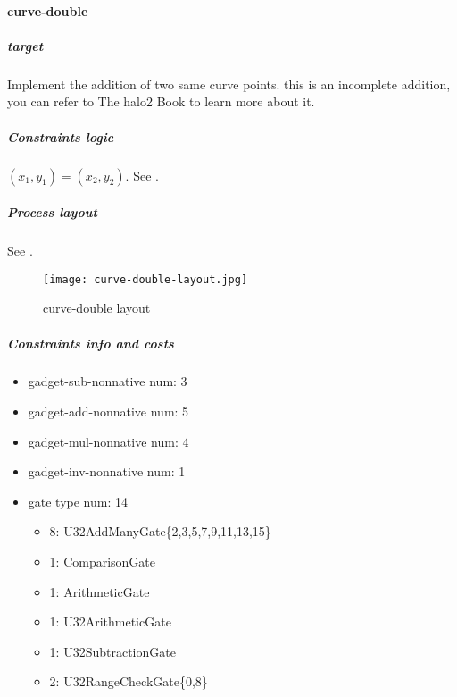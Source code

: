 \paragraph{curve-double}

\subparagraph{target}
Implement the addition of two same curve points. this is an incomplete addition, you can refer to The halo2 Book\cite{website:halo2-book} to learn more about it.

\subparagraph{Constraints logic}
$(x_1,y_1) = (x_2,y_2)$. See .

\subparagraph{Process layout}
See .
\begin{figure}[!ht]
    \centering
    \texttt{[image: curve-double-layout.jpg]}
    \caption{curve-double layout}
    \label{fig:curve-double-layout}
\end{figure}

\subparagraph{Constraints info and costs}
\begin{itemize}
    \item gadget-sub-nonnative num: 3
    \item gadget-add-nonnative num: 5
    \item gadget-mul-nonnative num: 4
    \item gadget-inv-nonnative num: 1
    \item gate type num: 14
        \begin{itemize}
            \item 8: U32AddManyGate\{2,3,5,7,9,11,13,15\}
            \item 1: ComparisonGate
            \item 1: ArithmeticGate
            \item 1: U32ArithmeticGate
            \item 1: U32SubtractionGate
            \item 2: U32RangeCheckGate\{0,8\}
        \end{itemize}
\end{itemize}

